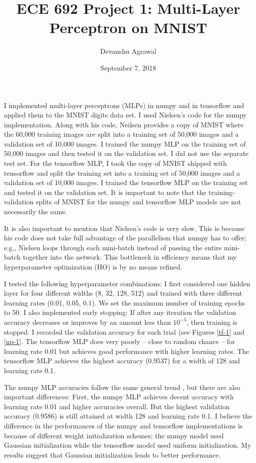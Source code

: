 \documentclass[11pt]{article}
\title{ECE 692 Project 1: Multi-Layer Perceptron on MNIST}
\author{Devanshu Agrawal}
\date{September 7, 2018}
\begin{document}
\maketitle

I implemented multi-layer perceptrons (MLPs) in numpy and in tensorflow and applied them to the MNIST digits data set. I used Nielsen's code for the numpy implementation. Along with his code, Neilsen provides a copy of MNIST where the 60,000 training images are split into a training set of 50,000 images and a validation set of 10,000 images. I trained the numpy MLP on the training set of 50,000 images and then tested it on the validation set. I did not use the separate test set. For the tensorflow MLP, I took the copy of MNIST shipped with tensorflow and split the training set into a training set of 50,000 images and a validation set of 10,000 images. I trained the tensorflow MLP on the training set and tested it on the validation set. It is important to note that the training-validation splits of MNIST for the numpy and tensorflow MLP models are not necessarily the same.

It is also important to mention that Nielsen's code is very slow. This is because his code does not take full advantage of the parallelism that numpy has to offer; e.g., Nielsen loops through each mini-batch instead of passing the entire mini-batch together into the network. This bottleneck in efficiency means that my hyperparameter optimization (HO) is by no means refined.

I tested the following hyperparameter combinations: I first considered one hidden layer for four different widths (8, 32, 128, 512) and trained with three different learning rates (0.01, 0.05, 0.1). We set the maximum number of training epochs to 50. I also implemented early stopping: If after any iteration the validation accuracy decreases or improves by an amount less than $10^{-5}$, then training is stopped. I recorded the validation accuracy for each trial (see Figures \ref{tf-1} and \ref{np-1}. The tensorflow MLP does very poorly -- close to random chance -- for learning rate 0.01 but achieves good performance with higher learning rates. The tensorflow MLP achieves the highest accuracy (0.9537) for a width of 128 and learning rate 0.1.

The numpy MLP accuracies follow the same general trend , but there are also important differences: First, the numpy MLP achieves decent accuracy with learning rate 0.01 and higher accuracies overall. But the highest validation accuracy (0.9586) is still attained at width 128 and learning rate 0.1. I believe the difference in the performances of the numpy and tensorflow implementations is because of different weight initialization schemes; the numpy model used Gaussian initialization while the tensorflow model used uniform initialization. My results suggest that Gaussian initialization leads to better performance.
\end{document}
